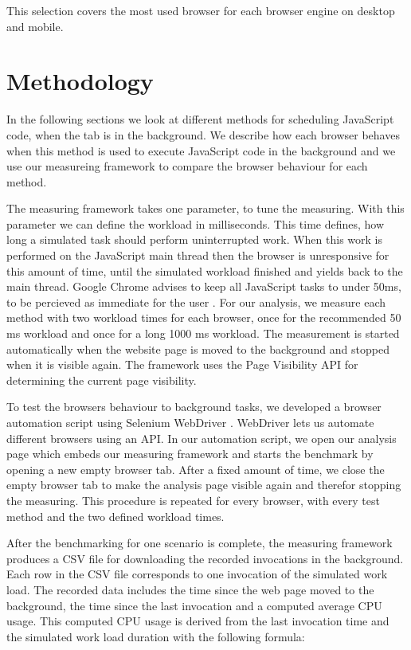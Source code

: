 \documentclass[
	ngerman,
	ruledheaders=section,%
	class=report,%
	thesis={type=bachelor},%
	accentcolor=9c,%
	custommargins=true,%
	marginpar=false,%
	parskip=half-,%
	fontsize=11pt,%
]{tudapub}
\begin{document}
  This selection covers the most used browser for each browser engine on desktop and mobile. 

  \section{Methodology}

  In the following sections we look at different methods for scheduling JavaScript code, when the tab is in the background. We describe how each browser behaves when this method is used to execute JavaScript code in the background and we use our measureing framework to compare the browser behaviour for each method.

  The measuring framework takes one parameter, to tune the measuring. With this parameter we can define the workload in milliseconds. This time defines, how long a simulated task should perform uninterrupted work. When this work is performed on the JavaScript main thread then the browser is unresponsive for this amount of time, until the simulated workload finished and yields back to the main thread. Google Chrome advises to keep all JavaScript tasks to under 50ms, to be percieved as immediate for the user \cite{chrome-rail-model}. For our analysis, we measure each method with two workload times for each browser, once for the recommended 50 ms workload and once for a long 1000 ms workload. The measurement is started automatically when the website page is moved to the background and stopped when it is visible again. The framework uses the Page Visibility API \cite{mdn-page-visibility} for determining the current page visibility.

  To test the browsers behaviour to background tasks, we developed a browser automation script using Selenium WebDriver \cite{webdriver}. WebDriver lets us automate different browsers using an API. In our automation script, we open our analysis page which embeds our measuring framework and starts the benchmark by opening a new empty browser tab. After a fixed amount of time, we close the empty browser tab to make the analysis page visible again and therefor stopping the measuring. This procedure is repeated for every browser, with every test method and the two defined workload times.

  After the benchmarking for one scenario is complete, the measuring framework produces a CSV file for downloading the recorded invocations in the background. Each row in the CSV file corresponds to one invocation of the simulated work load. The recorded data includes the time since the web page moved to the background, the time since the last invocation and a computed average CPU usage. This computed CPU usage is derived from the last invocation time and the simulated work load duration with the following formula:
\end{document}
